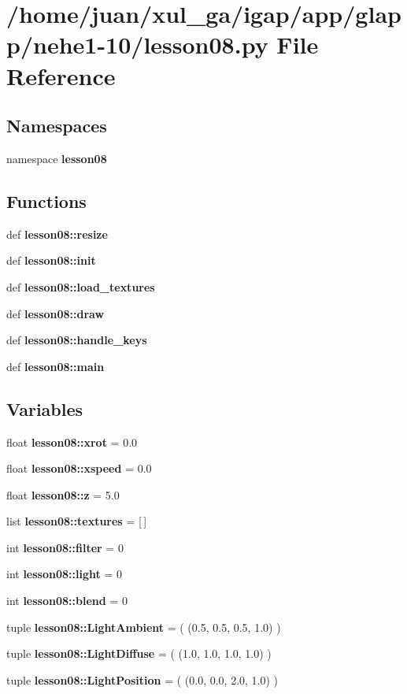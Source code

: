 \section{/home/juan/xul\_\-ga/igap/app/glapp/nehe1-10/lesson08.py File Reference}
\label{nehe1-10_2lesson08_8py}
\subsection*{Namespaces}
\begin{CompactItemize}
\item 
namespace {\bf lesson08}
\end{CompactItemize}
\subsection*{Functions}
\begin{CompactItemize}
\item 
def {\bf lesson08::resize}
\item 
def {\bf lesson08::init}
\item 
def {\bf lesson08::load\_\-textures}
\item 
def {\bf lesson08::draw}
\item 
def {\bf lesson08::handle\_\-keys}
\item 
def {\bf lesson08::main}
\end{CompactItemize}
\subsection*{Variables}
\begin{CompactItemize}
\item 
float {\bf lesson08::xrot} = 0.0
\item 
float {\bf lesson08::xspeed} = 0.0
\item 
float {\bf lesson08::z} = 5.0
\item 
list {\bf lesson08::textures} = [$\,$]
\item 
int {\bf lesson08::filter} = 0
\item 
int {\bf lesson08::light} = 0
\item 
int {\bf lesson08::blend} = 0
\item 
tuple {\bf lesson08::LightAmbient} = ( (0.5, 0.5, 0.5, 1.0) )
\item 
tuple {\bf lesson08::LightDiffuse} = ( (1.0, 1.0, 1.0, 1.0) )
\item 
tuple {\bf lesson08::LightPosition} = ( (0.0, 0.0, 2.0, 1.0) )
\end{CompactItemize}
